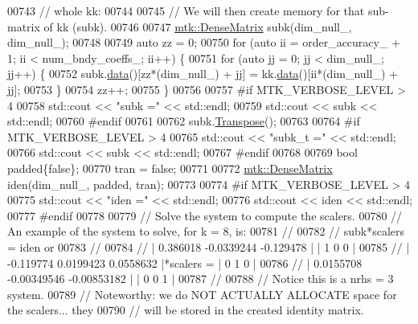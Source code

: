 \begin{DoxyCode}
{{00743   \textcolor{comment}{// whole kk:}
00744 
00745   \textcolor{comment}{// We will then create memory for that sub-matrix of kk (subk).}
00746 
00747   \hyperlink{classmtk_1_1DenseMatrix}{mtk::DenseMatrix} subk(dim\_null\_, dim\_null\_);
00748 
00749   \textcolor{keyword}{auto} zz = 0;
00750   \textcolor{keywordflow}{for} (\textcolor{keyword}{auto} ii = order\_accuracy\_ + 1; ii < num\_bndy\_coeffs\_; ii++) \{
00751     \textcolor{keywordflow}{for} (\textcolor{keyword}{auto} jj = 0; jj < dim\_null\_; jj++) \{
00752       subk.\hyperlink{classmtk_1_1DenseMatrix_a0c33b8a9e01d157c61ddbdf807c25d84}{data}()[zz*(dim\_null\_) + jj] = kk.\hyperlink{classmtk_1_1DenseMatrix_a0c33b8a9e01d157c61ddbdf807c25d84}{data}()[ii*(dim\_null\_) + jj];
00753     \}
00754     zz++;
00755   \}
00756 
00757 \textcolor{preprocessor}{  #if MTK\_VERBOSE\_LEVEL > 4}
00758   std::cout << \textcolor{stringliteral}{"subk ="} << std::endl;
00759   std::cout << subk << std::endl;
00760 \textcolor{preprocessor}{  #endif}
00761 
00762   subk.\hyperlink{classmtk_1_1DenseMatrix_a71d9c07ca66e88d97d1fd5012f43138b}{Transpose}();
00763 
00764 \textcolor{preprocessor}{  #if MTK\_VERBOSE\_LEVEL > 4}
00765   std::cout << \textcolor{stringliteral}{"subk\_t ="} << std::endl;
00766   std::cout << subk << std::endl;
00767 \textcolor{preprocessor}{  #endif}
00768 
00769   \textcolor{keywordtype}{bool} padded\{\textcolor{keyword}{false}\};
00770   tran = \textcolor{keyword}{false};
00771 
00772   \hyperlink{classmtk_1_1DenseMatrix}{mtk::DenseMatrix} iden(dim\_null\_, padded, tran);
00773 
00774 \textcolor{preprocessor}{  #if MTK\_VERBOSE\_LEVEL > 4}
00775   std::cout << \textcolor{stringliteral}{"iden ="} << std::endl;
00776   std::cout << iden << std::endl;
00777 \textcolor{preprocessor}{  #endif}
00778 
00779   \textcolor{comment}{// Solve the system to compute the scalers.}
00780   \textcolor{comment}{// An example of the system to solve, for k = 8, is:}
00781   \textcolor{comment}{//}
00782   \textcolor{comment}{// subk*scalers = iden or}
00783   \textcolor{comment}{//}
00784   \textcolor{comment}{// |  0.386018  -0.0339244   -0.129478 |           | 1 0 0 |}
00785   \textcolor{comment}{// | -0.119774   0.0199423   0.0558632 |*scalers = | 0 1 0 |}
00786   \textcolor{comment}{// | 0.0155708 -0.00349546 -0.00853182 |           | 0 0 1 |}
00787   \textcolor{comment}{//}
00788   \textcolor{comment}{// Notice this is a nrhs = 3 system.}
00789   \textcolor{comment}{// Noteworthy: we do NOT ACTUALLY ALLOCATE space for the scalers... they}
00790   \textcolor{comment}{// will be stored in the created identity matrix.}
}}
\end{DoxyCode}
